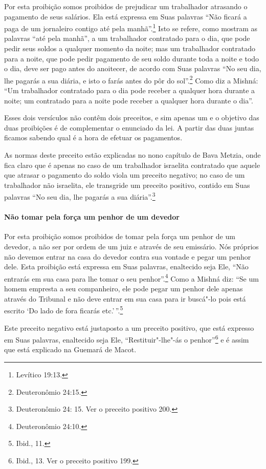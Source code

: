 \begin{multicols}{2}
Por esta proibição somos proibidos de prejudicar um trabalhador
atrasando o pagamento de seus salários. Ela está expressa em Suas
palavras ``Não ficará a paga de um jornaleiro contigo até pela manhã''.\footnote{Levítico 19:13.} Isto se refere, como mostram as palavras ``até pela
manhã'', a um trabalhador contratado para o dia, que pode pedir seus
soldos a qualquer momento da noite; mas um trabalhador contratado para a
noite, que pode pedir pagamento de seu soldo durante toda a noite e todo
o dia, deve ser pago antes do anoitecer, de acordo com Suas palavras
``No seu dia, lhe pagarás a sua diária, e isto o farás antes do pôr do
sol''.\footnote{Deuteronômio 24:15.} Como diz a Mishná\starr: ``Um trabalhador
contratado para o dia pode receber a qualquer hora durante a noite; um
contratado para a noite pode receber a qualquer hora durante o dia''.

Esses dois versículos não contêm dois preceitos, e sim apenas um e o
objetivo das duas proibições é de complementar o enunciado da lei. A
partir das duas juntas ficamos sabendo qual é a hora de efetuar os
pagamentos.

As normas deste preceito estão explicadas no nono capítulo de Bava
Metzia\starr, onde fica claro que é apenas no caso de um trabalhador israelita
contratado que aquele que atrasar o pagamento do soldo viola um
preceito negativo; no caso de um trabalhador não israelita, ele
transgride um preceito positivo, contido em Suas palavras ``No seu dia,
lhe pagarás a sua diária''.\footnote{Deuteronômio 24: 15. Ver o preceito positivo 200.}

\paragraph{Não tomar pela força um penhor de um devedor}

Por esta proibição somos proibidos de tomar pela força um penhor de um
devedor, a não ser por ordem de um juiz e através de seu emissário. Nós
próprios não devemos entrar na casa do devedor contra sua vontade e
pegar um penhor dele. Esta proibição está expressa em Suas palavras,
enaltecido seja Ele, ``Não entrarás em sua casa para lhe tomar o seu
penhor''.\footnote{Deuteronômio 24:10.} Como a Mishná\starr{} diz: ``Se um homem
empresta a seu companheiro, ele pode pegar um penhor dele apenas através
do Tribunal e não deve entrar em sua casa para ir buscá"-lo pois está
escrito `Do lado de fora ficarás etc.'\,''.\footnote{Ibid., 11.}

Este preceito negativo está justaposto a um preceito positivo, que está
expresso em Suas palavras, enaltecido seja Ele, ``Restituir"-lhe"-ás o
penhor''\footnote{Ibid., 13. Ver o preceito positivo 199.} e é assim que está explicado
na Guemará\starr{} de Macot\starr.


\end{multicols}
